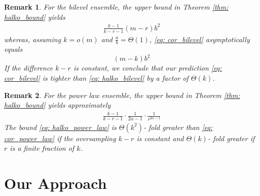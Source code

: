\documentclass[conference]{IEEEtran}
\newtheorem{remark}{Remark}
\begin{document}
\begin{remark}
    For the bilevel ensemble, the upper bound in Theorem \ref{thm: halko_bound} yields 
    \begin{align}\label{eq: halko_bilevel}
    \frac{k-1}{k-r-1} (m-r) b^2
    \end{align}
    whereas, assuming $k = o(m)$ and $\frac{a}{b} = \Theta(1)$, \eqref{eq: cor_bilevel} asymptotically equals  $$(m - k) b^2$$ If the difference $k-r$ is constant, we conclude that our prediction \eqref{eq: cor_bilevel} is tighter than \eqref{eq: halko_bilevel} by a factor of $\Theta(k)$. 
\end{remark}
\begin{remark}
    For the power law ensemble, the upper bound in Theorem \ref{thm: halko_bound} yields approximately
    \begin{align}\label{eq: halko_power_law}
         \frac{k-1}{k-r-1} \cdot \frac{1}{2 \alpha - 1} \cdot \frac{1}{r^{2 \alpha-1}}
    \end{align}
    The bound \eqref{eq: halko_power_law} is $\Theta(k^2)$- fold greater than \eqref{eq: cor_power_law} if the oversampling $k-r$ is constant and $\Theta(k)$- fold greater if $r$ is a finite fraction of $k$.
\end{remark}

\section{Our Approach}
\end{document}
